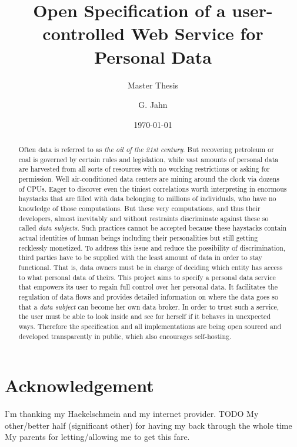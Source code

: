 \documentclass[12pt,english,a4paper,titlepage,cleardoublepage=empty,dottedtoc]{report}
\title{Open Specification of a user-controlled Web Service for Personal Data}
\subtitle{Master Thesis}
\author{G. Jahn}
\date{\today}
\begin{document}

\begin{abstract}
Often data is referred to as \emph{the oil of the 21st century}. But
recovering petroleum or coal is governed by certain rules and
legislation, while vast amounts of personal data are harvested from all
sorts of resources with no working restrictions or asking for
permission. Well air-conditioned data centers are mining around the
clock via dozens of CPUs. Eager to discover even the tiniest
correlations worth interpreting in enormous haystacks that are filled
with data belonging to millions of individuals, who have no knowledge of
those computations. But these very computations, and thus their
developers, almost inevitably and without restraints discriminate
against these so called \emph{data subjects}. Such practices cannot be
accepted because these haystacks contain actual identities of human
beings including their personalities but still getting recklessly
monetized. To address this issue and reduce the possibility of
discrimination, third parties have to be supplied with the least amount
of data in order to stay functional. That is, data owners must be in
charge of deciding which entity has access to what personal data of
theirs. This project aims to specify a personal data service that
empowers its user to regain full control over her personal data. It
facilitates the regulation of data flows and provides detailed
information on where the data goes so that a \emph{data subject} can
become her own data broker. In order to trust such a service, the user
must be able to look inside and see for herself if it behaves in
unexpected ways. Therefore the specification and all implementations are
being open sourced and developed transparently in public, which also
encourages self-hosting.
\end{abstract}

\section*{Acknowledgement}
I'm thanking my Haekelschmein and my internet provider. TODO My
other/better half (significant other) for having my back through the
whole time My parents for letting/allowing me to get this fare.
\newpage


{
\setcounter{tocdepth}{1}
\pagestyle{plain}
\tableofcontents
}
\newpage
{}
\listoftables
\newpage
{}
\listoffigures
\newpage
\newpage
\end{document}

